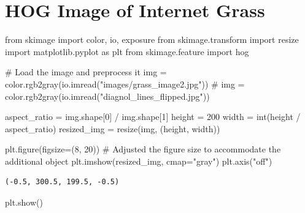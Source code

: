 \documentclass[
  letterpaper,
  DIV=11,
  numbers=noendperiod]{scrreprt}
\newenvironment{Shaded}{\begin{snugshade}}{\end{snugshade}}
\newcommand{\BuiltInTok}[1]{\textcolor[rgb]{0.00,0.23,0.31}{#1}}
\newcommand{\CommentTok}[1]{\textcolor[rgb]{0.37,0.37,0.37}{#1}}
\newcommand{\DecValTok}[1]{\textcolor[rgb]{0.68,0.00,0.00}{#1}}
\newcommand{\ImportTok}[1]{\textcolor[rgb]{0.00,0.46,0.62}{#1}}
\newcommand{\NormalTok}[1]{\textcolor[rgb]{0.00,0.23,0.31}{#1}}
\newcommand{\OperatorTok}[1]{\textcolor[rgb]{0.37,0.37,0.37}{#1}}
\newcommand{\StringTok}[1]{\textcolor[rgb]{0.13,0.47,0.30}{#1}}
\begin{document}
\hypertarget{hog-image-of-internet-grass}{%
\section{HOG Image of Internet
Grass}\label{hog-image-of-internet-grass}}

\begin{Shaded}
\begin{Highlighting}[]
\ImportTok{from}\NormalTok{ skimage }\ImportTok{import}\NormalTok{ color, io, exposure}
\ImportTok{from}\NormalTok{ skimage.transform }\ImportTok{import}\NormalTok{ resize}
\ImportTok{import}\NormalTok{ matplotlib.pyplot }\ImportTok{as}\NormalTok{ plt}
\ImportTok{from}\NormalTok{ skimage.feature }\ImportTok{import}\NormalTok{ hog}

\CommentTok{\# Load the image and preprocess it}
\NormalTok{img }\OperatorTok{=}\NormalTok{ color.rgb2gray(io.imread(}\StringTok{"images/grass\_image2.jpg"}\NormalTok{))}
\CommentTok{\# img = color.rgb2gray(io.imread("diagnol\_lines\_flipped.jpg"))}

\NormalTok{aspect\_ratio }\OperatorTok{=}\NormalTok{ img.shape[}\DecValTok{0}\NormalTok{] }\OperatorTok{/}\NormalTok{ img.shape[}\DecValTok{1}\NormalTok{]}
\NormalTok{height }\OperatorTok{=} \DecValTok{200}
\NormalTok{width }\OperatorTok{=} \BuiltInTok{int}\NormalTok{(height }\OperatorTok{/}\NormalTok{ aspect\_ratio)}
\NormalTok{resized\_img }\OperatorTok{=}\NormalTok{ resize(img, (height, width))}

\NormalTok{plt.figure(figsize}\OperatorTok{=}\NormalTok{(}\DecValTok{8}\NormalTok{, }\DecValTok{20}\NormalTok{))  }\CommentTok{\# Adjusted the figure size to accommodate the additional object}
\NormalTok{plt.imshow(resized\_img, cmap}\OperatorTok{=}\StringTok{"gray"}\NormalTok{)}
\NormalTok{plt.axis(}\StringTok{"off"}\NormalTok{)}
\end{Highlighting}
\end{Shaded}

\begin{verbatim}
(-0.5, 300.5, 199.5, -0.5)
\end{verbatim}

\begin{Shaded}
\begin{Highlighting}[]
\NormalTok{plt.show()}
\end{Highlighting}
\end{Shaded}
\end{document}
